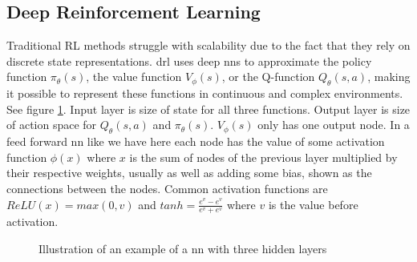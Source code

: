 \documentclass[UKenglish]{uiomasterthesis}
\begin{document}
\subsection{Deep Reinforcement Learning}
Traditional RL methods struggle with scalability due to the fact that they rely on discrete state representations. \ac{drl} uses deep \acp{nn} to approximate the policy function $\pi_\theta(s)$, the value function $V_\phi(s)$, or the Q-function $Q_\theta(s,a)$, making it possible to represent these functions in continuous and complex environments. See figure \ref{fig:neural_network}. Input layer is size of state for all three functions. Output layer is size of action space for $Q_\theta(s,a)$ and $\pi_\theta(s)$. $V_\phi(s)$ only has one output node. In a feed forward \ac{nn} like we have here each node has the value of some activation function $\phi(x)$ where $x$ is the sum of nodes of the previous layer multiplied by their respective weights, usually as well as adding some bias, shown as the connections between the nodes. Common activation functions are $ReLU(x) = max(0,v)$ and $tanh=\frac{e^v-e^v}{e^v+e^v}$ where $v$ is the value before activation.
\begin{figure}[H]
    \begin{center}
    \end{center}
    \caption{Illustration of an example of a \ac{nn} with three hidden layers}
    \label{fig:neural_network}
\end{figure}
\end{document}
